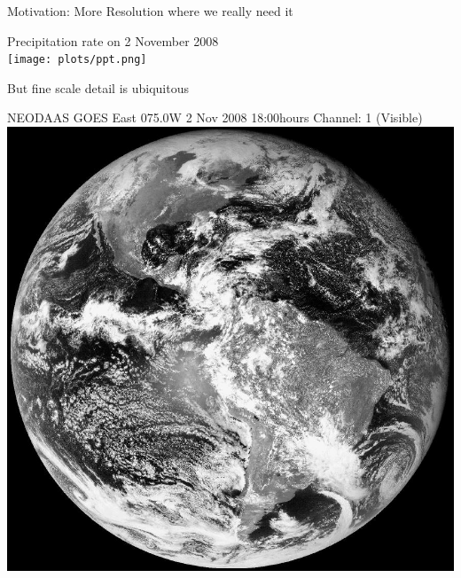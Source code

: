 \begin{slide}{Motivation: More Resolution where we really need it}

\vspace{0.5in}
\begin{center}
Precipitation rate on 2 November 2008\\
\texttt{[image: plots/ppt.png]}
\end{center}

\end{slide}

\begin{slide}{But fine scale detail is ubiquitous}

\begin{center}
NEODAAS GOES East 075.0W 2 Nov 2008 18:00hours Channel: 1 (Visible)
\includegraphics[scale=0.5]{plots/2008_11_2_1800_GOES12_1_S2.jpg}
\end{center}

\end{slide}


